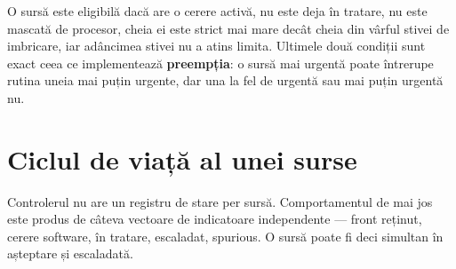 \documentclass[11pt,openany]{report}
\begin{document}
O sursă este eligibilă dacă are o cerere activă, nu este deja în tratare, nu
este mascată de procesor, cheia ei este strict mai mare decât cheia din vârful
stivei de imbricare, iar adâncimea stivei nu a atins limita. Ultimele două
condiții sunt exact ceea ce implementează \textbf{preempția}: o sursă mai
urgentă poate întrerupe rutina uneia mai puțin urgente, dar una la fel de
urgentă sau mai puțin urgentă nu.

\section{Ciclul de viață al unei surse}

Controlerul nu are un registru de stare per sursă. Comportamentul de mai jos
este produs de câteva vectoare de indicatoare independente --- front reținut,
cerere software, în tratare, escaladat, spurious. O sursă poate fi deci simultan
în așteptare și escaladată.
\end{document}
